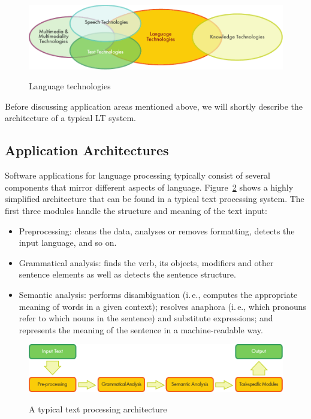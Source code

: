 \begin{multicols}{2}
\begin{figure}[htb]
  \center
  \includegraphics[width=\textwidth]{../_media/english/language_technologies}
  \caption{Language technologies}
  \label{fig:lt}
\end{figure}

Before discussing application areas mentioned above, we will shortly describe the architecture of a typical LT system.

\subsection{Application Architectures}

Software applications for language processing typically consist of several components that mirror different aspects of language.
Figure~\ref{fig:textprocessingarch_en} shows a highly simplified architecture that can be found in a typical text processing system.
The first three modules handle the structure and meaning of the text input:

\begin{itemize}
\item  Preprocessing: cleans the data, analyses or removes formatting, detects the input language, and so on.
\item  Grammatical analysis: finds the verb, its objects, modifiers and other sentence elements as well as detects the sentence structure.
\item  Semantic analysis: performs disambiguation (i.\,e., computes the appropriate meaning of words in a given context); resolves anaphora (i.\,e., which pronouns refer to which nouns in the sentence) and substitute expressions; and represents the meaning of the sentence in a machine-readable way.
\end{itemize}

\begin{figure}[htb]
  \center
  \includegraphics[width=\textwidth]{../_media/english/text_processing_app_architecture}
  \caption{A typical text processing architecture}
  \label{fig:textprocessingarch_en}
\end{figure}


\end{multicols}
